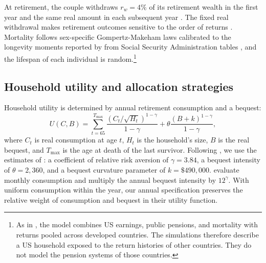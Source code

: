 \documentclass[12pt]{article}
\begin{document}
At retirement, the couple withdraws $r_w=4\%$ of its retirement wealth in the first year and the same
real amount in each subsequent year \citep{Bengen1994}. The fixed real withdrawal makes retirement
outcomes sensitive to the order of returns \citep{Estrada2018}. Mortality follows sex-specific
Gompertz-Makeham laws calibrated to the longevity moments reported by
\citet{AnarkulovaCederburgODoherty2025} from Social Security Administration tables \citep{SSA2020}, and
the lifespan of each individual is random.\footnote{As in \citet{AnarkulovaCederburgODoherty2025}, the
model combines US earnings, public pensions, and mortality with returns pooled across developed
countries. The simulations therefore describe a US household exposed to the return histories of other
countries. They do not model the pension systems of those countries.}

\subsection{Household utility and allocation strategies}
\label{sec:utility}\label{sec:portfolio-rules}

Household utility is determined by annual retirement consumption and a bequest:
\begin{equation}
 U(C,B)=\sum_{t=65}^{T_{\max}}
 \frac{(C_t/\sqrt{H_t})^{1-\gamma}}{1-\gamma}
 +\theta\frac{(B+k)^{1-\gamma}}{1-\gamma},
 \label{eq:utility}
\end{equation}
where $C_t$ is real consumption at age $t$, $H_t$ is the household's size, $B$ is the real bequest, and
$T_{\max}$ is the age at death of the last survivor. Following
\citet{AnarkulovaCederburgODoherty2025}, we use the estimates of \citet{DeNardiFrenchJones2010}: a
coefficient of relative risk aversion of $\gamma=3.84$, a bequest intensity of $\theta=2{,}360$, and a
bequest curvature parameter of $k=\$490{,}000$. \citet{AnarkulovaCederburgODoherty2025} evaluate monthly
consumption and multiply the annual bequest intensity by $12^\gamma$. With uniform consumption within
the year, our annual specification preserves the relative weight of consumption and bequest in their
utility function.
\end{document}
